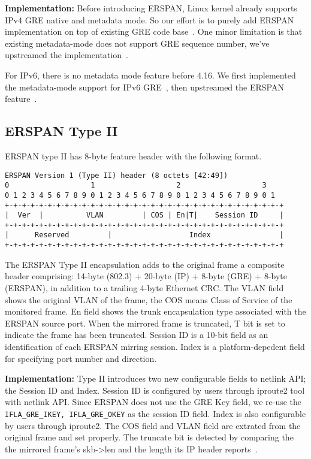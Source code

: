\documentclass{sigplanconf}
\begin{document}
\textbf{Implementation: }
Before introducing ERSPAN, Linux kernel already supports IPv4 GRE native
and metadata mode.  So our effort is to purely add ERSPAN implementation
on top of existing GRE code base~\cite{erspantype2}.
One minor limitation is that existing metadata-mode does not support
GRE sequence number, we've upstreamed the implementation~\cite{greseq}.

For IPv6, there is no metadata mode feature before 4.16.
We first implemented the metadata-mode support for IPv6 GRE~\cite{ip6md},
then upstreamed the ERSPAN feature~\cite{ip6erspanmd, ip6erspan}.


\subsection{ERSPAN Type II}
ERSPAN type II has 8-byte feature header with the following format.
{\scriptsize
\begin{verbatim}
ERSPAN Version 1 (Type II) header (8 octets [42:49])
0                   1                   2                   3
0 1 2 3 4 5 6 7 8 9 0 1 2 3 4 5 6 7 8 9 0 1 2 3 4 5 6 7 8 9 0 1
+-+-+-+-+-+-+-+-+-+-+-+-+-+-+-+-+-+-+-+-+-+-+-+-+-+-+-+-+-+-+-+-+
|  Ver  |          VLAN         | COS | En|T|    Session ID     |
+-+-+-+-+-+-+-+-+-+-+-+-+-+-+-+-+-+-+-+-+-+-+-+-+-+-+-+-+-+-+-+-+
|      Reserved         |                  Index                |
+-+-+-+-+-+-+-+-+-+-+-+-+-+-+-+-+-+-+-+-+-+-+-+-+-+-+-+-+-+-+-+-+
\end{verbatim}
}
The ERSPAN Type II encapsulation adds to the original
frame a composite header comprising: 14-byte (802.3) + 20-byte (IP)
+ 8-byte (GRE)  + 8-byte (ERSPAN), in addition to a trailing 4-byte
Ethernet CRC.
The VLAN field shows the original VLAN of the frame, the COS means
Class of Service of the monitored frame.
En field shows the trunk encapsulation type associated with the ERSPAN
source port.
When the mirrored frame is truncated, T bit is set to indicate the
frame has been truncated.
Session ID is a 10-bit field as an identification of each ERSPAN mirring
session.
Index is a platform-depedent field for specifying port number and direction.

\textbf{Implementation: }
Type II introduces two new configurable fields to netlink API;
the Session ID and Index.
Session ID is configured by users through iproute2 tool with netlink API. 
Since ERSPAN does not use the GRE Key field, we re-use the
\texttt{IFLA\_GRE\_IKEY, IFLA\_GRE\_OKEY} as the session ID field.
Index is also configurable by users through iproute2.
The COS field and VLAN field are extrated from the original frame and set
properly.  The truncate bit is detected by comparing the the mirrored frame's
skb->len and the length its IP header reports~\cite{erspantruncate}.
\end{document}
